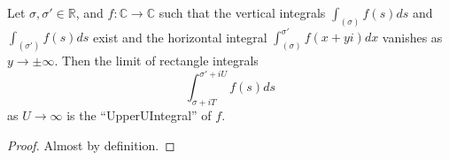 \begin{lemma}
\label{RectangleIntegral_tendsTo_UpperU}
\leanok
Let $\sigma,\sigma' \in \mathbb{R}$, and $f : \mathbb{C} \to \mathbb{C}$ such that
  the vertical integrals $\int_{(\sigma)}f(s)ds$ and $\int_{(\sigma')}f(s)ds$ exist and
  the horizontal integral $\int_{(\sigma)}^{\sigma'}f(x + yi)dx$ vanishes as $y \to \pm \infty$.
  Then the limit of rectangle integrals
  $$\int_{\sigma+iT}^{\sigma'+iU}f(s)ds$$
  as $U\to\infty$ is the ``UpperUIntegral'' of $f$.
\end{lemma}
\begin{proof}
\leanok
Almost by definition.
\end{proof}
